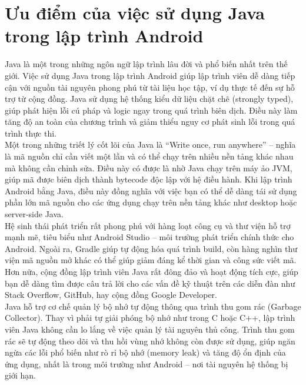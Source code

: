 \section{ Ưu điểm của việc sử dụng Java trong lập trình Android}
    \begin{flushleft}
        \hspace*{0.8cm}Java là một trong những ngôn ngữ lập trình lâu đời và phổ biến nhất trên thế giới. Việc sử dụng Java trong lập trình Android giúp lập trình viên dễ dàng tiếp cận với nguồn tài nguyên phong phú từ tài liệu học tập, ví dụ thực tế đến sự hỗ trợ từ cộng đồng. Java sử dụng hệ thống kiểu dữ liệu chặt chẽ (strongly typed), giúp phát hiện lỗi cú pháp và logic ngay trong quá trình biên dịch. Điều này làm tăng độ an toàn của chương trình và giảm thiểu nguy cơ phát sinh lỗi trong quá trình thực thi.\\
        \hspace*{0.8cm}Một trong những triết lý cốt lõi của Java là “Write once, run anywhere” – nghĩa là mã nguồn chỉ cần viết một lần và có thể chạy trên nhiều nền tảng khác nhau mà không cần chỉnh sửa. Điều này có được là nhờ Java chạy trên máy ảo JVM, giúp mã được biên dịch thành bytecode độc lập với hệ điều hành. Khi lập trình Android bằng Java, điều này đồng nghĩa với việc bạn có thể dễ dàng tái sử dụng phần lớn mã nguồn cho các ứng dụng chạy trên nền tảng khác như desktop hoặc server-side Java.\\
        \hspace*{0.8cm}Hệ sinh thái phát triển rất phong phú với hàng loạt công cụ và thư viện hỗ trợ mạnh mẽ, tiêu biểu như Android Studio – môi trường phát triển chính thức cho Android. Ngoài ra, Gradle giúp tự động hóa quá trình build, còn hàng nghìn thư viện mã nguồn mở khác có thể giúp giảm đáng kể thời gian và công sức viết mã. Hơn nữa, cộng đồng lập trình viên Java rất đông đảo và hoạt động tích cực, giúp bạn dễ dàng tìm được câu trả lời cho các vấn đề kỹ thuật trên các diễn đàn như Stack Overflow, GitHub, hay cộng đồng Google Developer.\\
        \hspace*{0.8cm}Java hỗ trợ cơ chế quản lý bộ nhớ tự động thông qua trình thu gom rác (Garbage Collector). Thay vì phải tự giải phóng bộ nhớ như trong C hoặc C++, lập trình viên Java không cần lo lắng về việc quản lý tài nguyên thủ công. Trình thu gom rác sẽ tự động theo dõi và thu hồi vùng nhớ không còn được sử dụng, giúp ngăn ngừa các lỗi phổ biến như rò rỉ bộ nhớ (memory leak) và tăng độ ổn định của ứng dụng, nhất là trong môi trường như Android – nơi tài nguyên hệ thống bị giới hạn.\\
    \end{flushleft}

